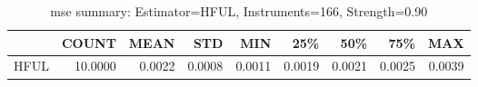 \begin{table}[ht]
\centering
\caption{mse summary: Estimator=HFUL, Instruments=166, Strength=0.90}
\begin{tabular}{lrrrrrrrr}
\toprule
 & COUNT & MEAN & STD & MIN & 25\% & 50\% & 75\% & MAX \\
\midrule
HFUL & 10.0000 & 0.0022 & 0.0008 & 0.0011 & 0.0019 & 0.0021 & 0.0025 & 0.0039 \\
\bottomrule
\end{tabular}
\end{table}
